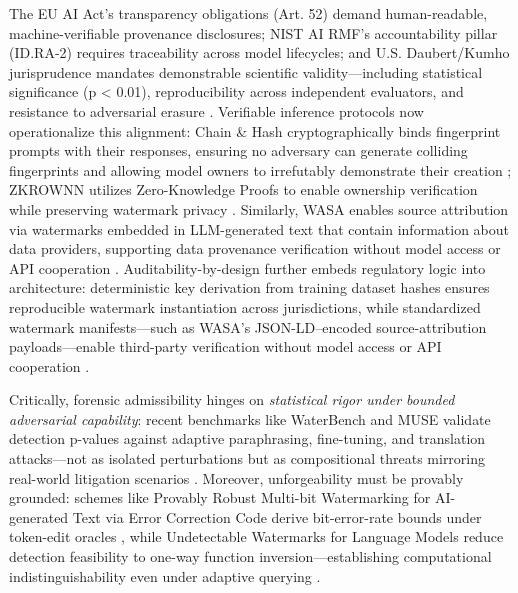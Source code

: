 \documentclass[11pt,a4paper]{article}
\begin{document}
The EU AI Act's transparency obligations (Art. 52) demand human-readable, machine-verifiable provenance disclosures; NIST AI RMF's accountability pillar (ID.RA-2) requires traceability across model lifecycles; and U.S. Daubert/Kumho jurisprudence mandates demonstrable scientific validity---including statistical significance (p < 0.01), reproducibility across independent evaluators, and resistance to adversarial erasure \cite{arxiv:2301.10226,arxiv:2307.15593,doi:10.1109/eurosp57164.2023.00072}. Verifiable inference protocols now operationalize this alignment: Chain \& Hash cryptographically binds fingerprint prompts with their responses, ensuring no adversary can generate colliding fingerprints and allowing model owners to irrefutably demonstrate their creation \cite{arxiv:2407.10887}; ZKROWNN utilizes Zero-Knowledge Proofs to enable ownership verification while preserving watermark privacy \cite{doi:10.1109/dac56929.2023.10247798}. Similarly, WASA enables source attribution via watermarks embedded in LLM-generated text that contain information about data providers, supporting data provenance verification without model access or API cooperation \cite{arxiv:2310.00646}. Auditability-by-design further embeds regulatory logic into architecture: deterministic key derivation from training dataset hashes ensures reproducible watermark instantiation across jurisdictions, while standardized watermark manifests---such as WASA's JSON-LD--encoded source-attribution payloads---enable third-party verification without model access or API cooperation \cite{arxiv:2310.00646,doi:10.1109/icassp48485.2024.10447264}.

Critically, forensic admissibility hinges on \emph{statistical rigor under bounded adversarial capability}: recent benchmarks like WaterBench and MUSE validate detection p-values against adaptive paraphrasing, fine-tuning, and translation attacks---not as isolated perturbations but as compositional threats mirroring real-world litigation scenarios \cite{arxiv:2405.13517,arxiv:2410.23861}. Moreover, unforgeability must be provably grounded: schemes like Provably Robust Multi-bit Watermarking for AI-generated Text via Error Correction Code derive bit-error-rate bounds under token-edit oracles \cite{arxiv:2401.16820}, while Undetectable Watermarks for Language Models reduce detection feasibility to one-way function inversion---establishing computational indistinguishability even under adaptive querying \cite{arxiv:2306.09194}.
\end{document}

